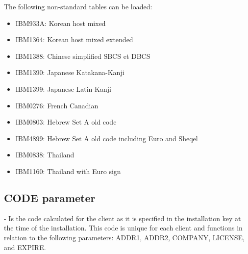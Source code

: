 \documentclass[letterpaper,10pt,english]{sphinxmanual}
\begin{document}
The following non-standard tables can be loaded:
\begin{itemize}
\item {} 
IBM933A: Korean host mixed

\item {} 
IBM1364: Korean host mixed extended

\item {} 
IBM1388: Chinese simplified SBCS et DBCS

\item {} 
IBM1390: Japanese Katakana-Kanji

\item {} 
IBM1399: Japanese Latin-Kanji

\item {} 
IBM0276: French Canadian

\item {} 
IBM0803: Hebrew Set A old code

\item {} 
IBM4899: Hebrew Set A old code including Euro and Sheqel

\item {} 
IBM0838: Thailand

\item {} 
IBM1160: Thailand with Euro sign

\end{itemize}


\subsection{CODE parameter}
\label{\detokenize{Installation_Guide:code-parameter}}\label{\detokenize{Installation_Guide:index-43}}
\begin{sphinxVerbatim}[commandchars=\\\{\}]
 
\end{sphinxVerbatim}

 - Is the code calculated for the client as it is specified in the installation key at the time of the installation. This code
is unique for each client and functions in relation to the following parameters: ADDR1, ADDR2, COMPANY, LICENSE, and EXPIRE.

\end{document}
